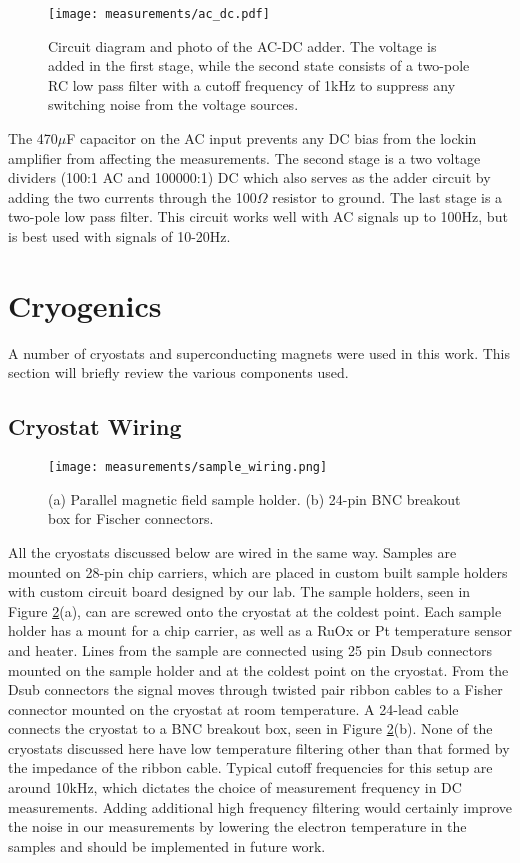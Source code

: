 \begin{figure}
    \centering
    \texttt{[image: measurements/ac\_dc.pdf]}
    \caption{Circuit diagram and photo of the AC-DC adder. The voltage is added in the first stage, while the second state consists of a two-pole RC low pass filter with a cutoff frequency of 1kHz to suppress any switching noise from the voltage sources.}
    \label{fig:ac_dc}
\end{figure}

The 470$\mu$F capacitor on the AC input prevents any DC bias from the lockin amplifier from affecting the measurements. The second stage is a two voltage dividers (100:1 AC and 100000:1) DC which also serves as the adder circuit by adding the two currents through the 100$\Omega$ resistor to ground. The last stage is a two-pole low pass filter. This circuit works well with AC signals up to 100Hz, but is best used with signals of 10-20Hz.

\section{Cryogenics}

A number of cryostats and superconducting magnets were used in this work. This section will briefly review the various components used.

\subsection{Cryostat Wiring}

\begin{figure}
    \centering
    \texttt{[image: measurements/sample\_wiring.png]}
    \caption{(a) Parallel magnetic field sample holder. (b) 24-pin BNC breakout box for Fischer connectors.}
    \label{fig:wiring}
\end{figure}

All the cryostats discussed below are wired in the same way. Samples are mounted on 28-pin chip carriers, which are placed in custom built sample holders with custom circuit board designed by our lab. The sample holders, seen in Figure \ref{fig:wiring}(a), can are screwed onto the cryostat at the coldest point. Each sample holder has a mount for a chip carrier, as well as a RuOx or Pt temperature sensor and heater. Lines from the sample are connected using 25 pin Dsub connectors mounted on the sample holder and at the coldest point on the cryostat. From the Dsub connectors the signal moves through twisted pair ribbon cables to a Fisher connector mounted on the cryostat at room temperature. A 24-lead cable connects the cryostat to a BNC breakout box, seen in Figure \ref{fig:wiring}(b). None of the cryostats discussed here have low temperature filtering other than that formed by the impedance of the ribbon cable. Typical cutoff frequencies for this setup are around 10kHz, which dictates the choice of measurement frequency in DC measurements. Adding additional high frequency filtering would certainly improve the noise in our measurements by lowering the electron temperature in the samples and should be implemented in future work.


